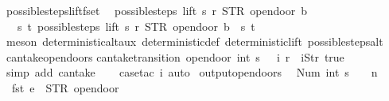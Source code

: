 \begin{isabellebody}
\ possible{\isacharunderscore}steps{\isacharunderscore}lift{\isacharunderscore}fset{\isacharcolon}\isanewline
\ \ {\isachardoublequoteopen}possible{\isacharunderscore}steps\ lift\ s\ r\ STR\ {\isacharprime}{\isacharprime}opendoor{\isacharprime}{\isacharprime}\ b\ {\isasymnoteq}\ {\isacharbraceleft}{\isacharbar}{\isacharbar}{\isacharbraceright}\ {\isasymLongrightarrow}\isanewline
\ \ \ {\isasymexists}s{\isacharprime}\ t{\isachardot}\ possible{\isacharunderscore}steps\ lift\ s\ r\ STR\ {\isacharprime}{\isacharprime}opendoor{\isacharprime}{\isacharprime}\ b\ {\isacharequal}\ {\isacharbraceleft}{\isacharbar}{\isacharparenleft}s{\isacharprime}{\isacharcomma}\ t{\isacharparenright}{\isacharbar}{\isacharbraceright}{\isachardoublequoteclose}\isanewline
%
\isadelimproof
\ \ %
\endisadelimproof
%
\isatagproof
{}\isamarkupfalse%
\ {\isacharparenleft}meson\ deterministic{\isacharunderscore}alt{\isacharunderscore}aux\ deterministic{\isacharunderscore}def\ deterministic{\isacharunderscore}lift\ possible{\isacharunderscore}steps{\isacharunderscore}alt{\isacharparenright}%
\endisatagproof
{\isafoldproof}%
%
\isadelimproof
\isanewline
%
\endisadelimproof
\isanewline
{}\isamarkupfalse%
\ can{\isacharunderscore}take{\isacharunderscore}opendoors{\isacharcolon}\isanewline
{\isachardoublequoteopen}can{\isacharunderscore}take{\isacharunderscore}transition\ {\isacharparenleft}opendoor\ {\isacharparenleft}int\ {\isacharparenleft}s\ {\isacharminus}\ {}{\isacharparenright}{\isacharparenright}{\isacharparenright}\ i\ r\ {\isacharequal}\ {\isacharparenleft}i{\isacharequal}{\isacharbrackleft}Str\ {\isacharprime}{\isacharprime}true{\isacharprime}{\isacharprime}{\isacharbrackright}{\isacharparenright}{\isachardoublequoteclose}\isanewline
%
\isadelimproof
\ \ %
\endisadelimproof
%
\isatagproof
{}\isamarkupfalse%
\ {\isacharparenleft}simp\ add{\isacharcolon}\ can{\isacharunderscore}take{\isacharparenright}\isanewline
\ \ \isamarkupfalse%
\ {\isacharparenleft}case{\isacharunderscore}tac\ i{\isacharcomma}\ auto{\isacharparenright}%
\endisatagproof
{\isafoldproof}%
%
\isadelimproof
\isanewline
%
\endisadelimproof
\isanewline
{}\isamarkupfalse%
\ output{\isacharunderscore}opendoors{\isacharcolon}\isanewline
\ \ {\isachardoublequoteopen}Num\ {\isacharparenleft}int\ {\isacharparenleft}s\ {\isacharminus}\ {}{\isacharparenright}{\isacharparenright}\ {\isasymnoteq}\ n\ {\isasymLongrightarrow}\isanewline
\ \ fst\ e\ {\isacharequal}\ STR\ {\isacharprime}{\isacharprime}opendoor{\isacharprime}{\isacharprime}\ {\isasymLongrightarrow}\isanewline

\end{isabellebody}
